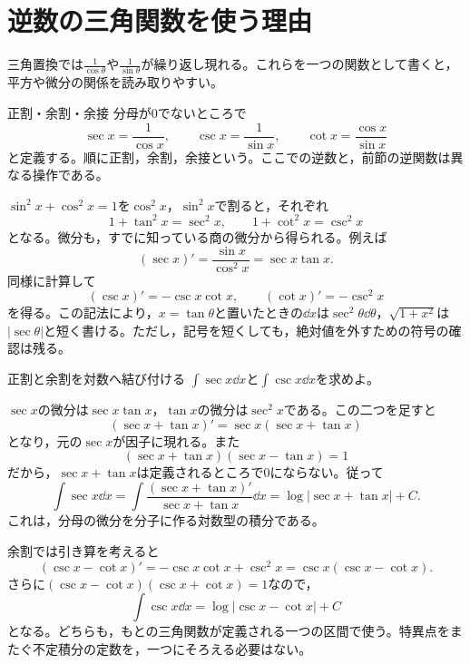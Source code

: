 \section{逆数の三角関数を使う理由}\label{節:相反三角関数}

三角置換では$\frac1{\cos\theta}$や$\frac1{\sin\theta}$が繰り返し現れる。これらを一つの関数として書くと，平方や微分の関係を読み取りやすい。
\begin{definition}{正割・余割・余接}
分母が$0$でないところで
\[
\sec x=\frac1{\cos x},\qquad
\csc x=\frac1{\sin x},\qquad
\cot x=\frac{\cos x}{\sin x}
\]
と定義する。順に正割，余割，余接という。ここでの逆数と，前節の逆関数は異なる操作である。
\end{definition}

$\sin^2x+\cos^2x=1$を$\cos^2x$，$\sin^2x$で割ると，それぞれ
\[
1+\tan^2x=\sec^2x,\qquad
1+\cot^2x=\csc^2x
\]
となる。微分も，すでに知っている商の微分から得られる。例えば
\[
(\sec x)'=\frac{\sin x}{\cos^2x}=\sec x\tan x.
\]
同様に計算して
\begin{equation}\label{式:相反三角関数の微分}
(\csc x)'=-\csc x\cot x,\qquad
(\cot x)'=-\csc^2x
\end{equation}
を得る。この記法により，$x=\tan\theta$と置いたときの$\dd x$は$\sec^2\theta\dd\theta$，$\sqrt{1+x^2}$は$|\sec\theta|$と短く書ける。ただし，記号を短くしても，絶対値を外すための符号の確認は残る。

\begin{example}{正割と余割を対数へ結び付ける}
$\int\sec x\dd x$と$\int\csc x\dd x$を求めよ。
\end{example}

$\sec x$の微分は$\sec x\tan x$，$\tan x$の微分は$\sec^2x$である。この二つを足すと
\[
(\sec x+\tan x)'=\sec x(\sec x+\tan x)
\]
となり，元の$\sec x$が因子に現れる。また
\[
(\sec x+\tan x)(\sec x-\tan x)=1
\]
だから，$\sec x+\tan x$は定義されるところで$0$にならない。従って
\[
\int\sec x\dd x
=\int\frac{(\sec x+\tan x)'}{\sec x+\tan x}\dd x
=\log|\sec x+\tan x|+C.
\]
これは，分母の微分を分子に作る対数型の積分である。

余割では引き算を考えると
\[
(\csc x-\cot x)'=-\csc x\cot x+\csc^2x
=\csc x(\csc x-\cot x).
\]
さらに$(\csc x-\cot x)(\csc x+\cot x)=1$なので，
\[
\int\csc x\dd x=\log|\csc x-\cot x|+C
\]
となる。どちらも，もとの三角関数が定義される一つの区間で使う。特異点をまたぐ不定積分の定数を，一つにそろえる必要はない。

